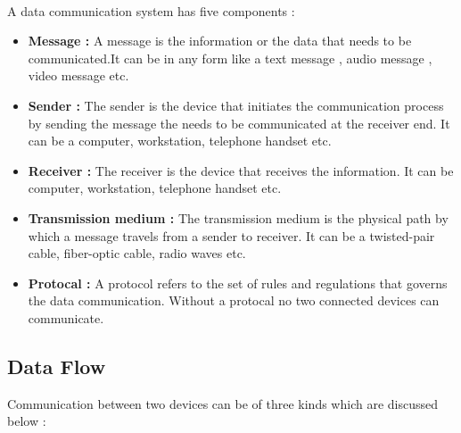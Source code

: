 \documentclass[12pt,a4paper]{article}%
\begin{document}
\begin{flushleft}
		\paragraph{} 
		A data communication system has five components :
		\begin{itemize}
			\item \textbf{Message : } A message is the information or the data that needs to be communicated.It can be in any form like a text message , audio message , video message etc.
			\item \textbf{Sender : } The sender is the device that initiates the communication process by sending the message the needs to be communicated at the receiver end. It can be a computer, workstation, telephone handset etc.
			\item \textbf{Receiver : } The receiver is the device that receives the information. It can be computer, workstation, telephone handset etc.
			\item \textbf{Transmission medium : } The transmission medium is the physical path by which a message travels from a sender to receiver. It can be a twisted-pair cable, fiber-optic cable, radio waves etc.
			\item \textbf{Protocal : } A protocol refers to the set of rules and regulations that governs the data communication. Without a protocal no two connected devices can communicate.\\\bigskip
		\end{itemize}
		\subsection{Data Flow}
		Communication between two devices can be of three kinds which are discussed below :
		

\end{flushleft}
\end{document}
